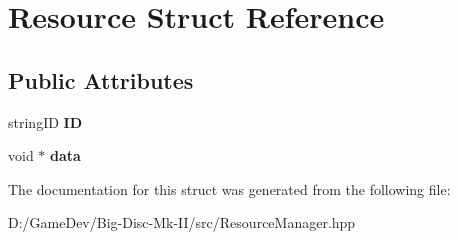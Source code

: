 \hypertarget{struct_resource}{}\section{Resource Struct Reference}
\label{struct_resource}
\subsection*{Public Attributes}
\begin{DoxyCompactItemize}
\item 
\mbox{\label{struct_resource_ad636eca1d7bde0b0451440f2d1087533}} 
string\+ID {\bfseries ID}
\item 
\mbox{\label{struct_resource_ae9cf3a6407991247cf7920f5393fe6b5}} 
void $\ast$ {\bfseries data}
\end{DoxyCompactItemize}


The documentation for this struct was generated from the following file\+:\begin{DoxyCompactItemize}
\item 
D\+:/\+Game\+Dev/\+Big-\/\+Disc-\/\+Mk-\/\+I\+I/src/Resource\+Manager.\+hpp\end{DoxyCompactItemize}
